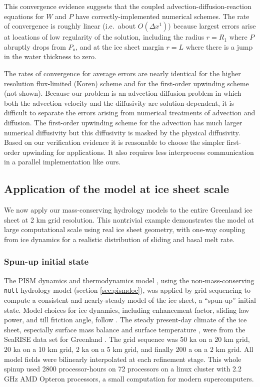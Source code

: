 \documentclass[gmd]{copernicus}   %
\begin{document}
This convergence evidence suggests that the coupled advection-diffusion-reaction equations for $W$ and $P$ have correctly-implemented numerical schemes.  The rate of convergence is roughly linear (i.e.~about $O(\Delta x^1)$) because largest errors arise at locations of low regularity of the solution, including the radius $r=R_1$ where $P$ abruptly drops from $P_o$, and at the ice sheet margin $r=L$ where there is a jump in the water thickness to zero.

The rates of convergence for average errors are nearly identical for the higher resolution flux-limited (Koren) scheme and for the first-order upwinding scheme (not shown).  Because our problem is an advection-diffusion problem in which both the advection velocity and the diffusivity are solution-dependent, it is difficult to separate the errors arising from numerical treatments of advection and diffusion.  The first-order upwinding scheme for the advection has much larger numerical diffusivity but this diffusivity is masked by the physical diffusivity.  Based on our verification evidence it is reasonable to choose the simpler first-order upwinding for applications.  It also requires less interprocess communication in a parallel implementation like ours.


\subsection{Application of the model at ice sheet scale}

We now apply our mass-conserving hydrology models to the entire Greenland ice sheet at 2 km grid resolution.  This nontrivial example demonstrates the model at large computational scale using real ice sheet geometry, with one-way coupling from ice dynamics for a realistic distribution of sliding and basal melt rate.

\subsubsection{Spun-up initial state}  The PISM dynamics and thermodynamics model \citep{BBssasliding,Winkelmannetal2011,AschwandenBuelerKhroulevBlatter}, using the non-mass-conserving \texttt{null} hydrology model (section \ref{sec:pismdoc}), was applied by grid sequencing to compute a consistent and nearly-steady model of the ice sheet, a ``spun-up'' initial state.  Model choices for ice dynamics, including enhancement factor, sliding law power, and till friction angle, follow \cite{AschwandenAdalgeirsdottirKhroulev}.  The steady present-day climate of the ice sheet, especially surface mass balance and surface temperature \citep{Ettemaetal2009}, were from the SeaRISE data set for Greenland \citep{Bindschadler2013SeaRISE}.  The grid sequence was 50 ka on a 20 km grid, 20 ka on a 10 km grid, 2 ka on a 5 km grid, and finally 200 a on a 2 km grid.  All model fields were bilinearly interpolated at each refinement stage.  This whole spinup used 2800 processor-hours on 72 processors on a linux cluster with 2.2 GHz AMD Opteron processors, a small computation for modern supercomputers.
\end{document}
